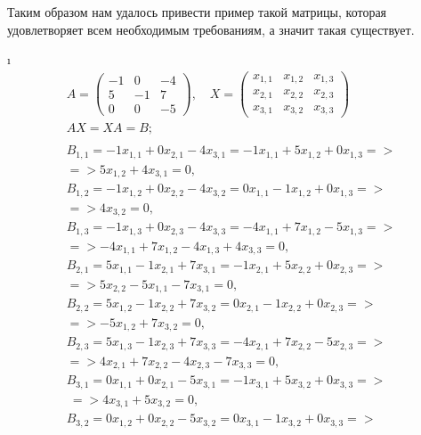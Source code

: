 Таким образом нам удалось привести пример такой матрицы, которая удовлетворяет всем необходимым требованиям, а значит такая существует.


\i 
\begin{gather*}
    A = \begin{pmatrix}
        -1 & 0 & -4\\
        5 & -1 & 7\\
        0 & 0 & -5
    \end{pmatrix}, \quad X = \begin{pmatrix}
        x_{1, 1} & x_{1, 2} & x_{1, 3}\\
        x_{2, 1} & x_{2, 2} & x_{2, 3}\\
        x_{3, 1} & x_{3, 2} & x_{3, 3}
    \end{pmatrix}\\
    AX = XA = B;\\
    \\
    B_{1, 1} = -1x_{1, 1} + 0x_{2, 1} -4x_{3, 1} = -1x_{1, 1} + 5x_{1, 2} + 0x_{1, 3} => \\
        => 5x_{1, 2} + 4x_{3,1} = 0,\\
    B_{1, 2} = -1x_{1, 2} + 0x_{2, 2} -4x_{3, 2} = 0x_{1, 1} -1x_{1, 2} + 0x_{1, 3} =>\\
        => 4x_{3, 2} = 0,\\
    B_{1, 3} = -1x_{1, 3} + 0x_{2, 3} -4x_{3, 3} = -4x_{1, 1} + 7x_{1, 2} - 5x_{1, 3} => \\
        => -4x_{1, 1} + 7x_{1, 2} -4x_{1, 3} + 4x_{3, 3} = 0,\\
    B_{2, 1} = 5x_{1, 1} - 1x_{2, 1} + 7x_{3, 1} = -1x_{2, 1} + 5x_{2, 2} + 0x_{2, 3} => \\
        => 5x_{2, 2} - 5x_{1, 1} - 7x_{3, 1} = 0,\\
    B_{2, 2} = 5x_{1, 2} - 1x_{2, 2} + 7x_{3, 2} = 0x_{2, 1} - 1x_{2, 2} + 0x_{2, 3} =>\\
        => -5x_{1, 2} + 7x_{3, 2} = 0,\\
    B_{2, 3} = 5x_{1, 3} - 1x_{2, 3} + 7x_{3, 3} = -4x_{2, 1} +  7x_{2, 2} - 5x_{2, 3} =>\\
        => 4x_{2, 1} + 7x_{2, 2} - 4x_{2, 3} - 7x_{3, 3} = 0,\\
    B_{3, 1} = 0x_{1, 1} + 0x_{2, 1} -5x_{3, 1} = -1x_{3, 1} + 5x_{3, 2} + 0x_{3, 3} =>\\\
        => 4x_{3, 1} + 5x_{3, 2} = 0,\\
    B_{3, 2} = 0x_{1, 2} + 0x_{2, 2} -5x_{3, 2} = 0x_{3, 1} - 1x_{3, 2} + 0x_{3, 3} =>\\

\end{gather*}
